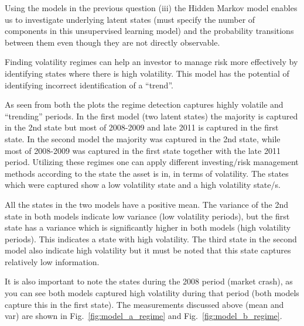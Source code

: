 \noindent
Using the models in the previous question (iii) the Hidden Markov model enables us to investigate underlying latent states (must specify the number of components in this unsupervised learning model) and the probability transitions between them even though they are not directly observable. 

\noindent
Finding volatility regimes can help an investor to manage risk more effectively by identifying states where there is high volatility. This model has the potential of identifying incorrect identification of a “trend”. 

\noindent 
As seen from both the plots the regime detection captures highly volatile and “trending” periods. In the first model (two latent states) the majority is captured in the 2nd state but most of 2008-2009 and late 2011 is captured in the first state. In the second model the majority was captured in the 2nd state, while most of 2008-2009 was captured in the first state together with the late 2011 period. Utilizing these regimes one can apply different investing/risk management methods according to the state the asset is in, in terms of volatility. The states which were captured show a low volatility state and a high volatility state/s.

\noindent
All the states in the two models have a positive mean. The variance of the 2nd state in both models indicate low variance (low volatility periods), but the first state has a variance which is significantly higher in both models (high volatility periods). This indicates a state with high volatility. The third state in the second model also indicate high volatility but it must be noted that this state captures relatively low information. 

\noindent
It is also important to note the states during the 2008 period (market crash), as you can see both models captured high volatility during that period (both models capture this in the first state). The measurements discussed above (mean and var) are shown in Fig.~\ref{fig:model_a_regime} and Fig.~\ref{fig:model_b_regime}. 

